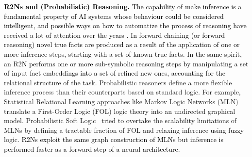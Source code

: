 \documentclass[journal]{IEEEtran}
\newcommand{\ar}[1]{\textcolor{black}{#1}}
\begin{document}
\ar{{\bf R2Ns and (Probabilistic) Reasoning. } The capability of make inference is a fundamental property of AI systems whose behaviour could be considered intelligent, and possible ways on how to automatize the process of reasoning have received a lot of attention over the years \cite{robinson2001handbook}. In forward chaining (or forward reasoning) \cite{russell2010artificial} novel true facts are produced as a result of the application of one or more inference steps, starting with a set of known true facts. In the same spirit, an R2N performs one or more sub-symbolic reasoning steps by manipulating a set of input fact embeddings into a set of refined new ones, accounting for the relational structure of the task.}
Probabilistic reasoners define a more flexible inference process than their counterparts based on standard logic. For example, Statistical Relational Learning approaches like Markov Logic Networks (MLN)~\cite{richardson2006markov} translate a  First-Order Logic (FOL) logic theory into an undirected graphical model.
Probabilistic Soft Logic~\cite{bach2017hinge} tried to overtake the scalability limitations of MLNs by defining a tractable fraction of FOL and relaxing inference using fuzzy logic. \ar{R2Ns exploit the same graph construction of MLNs but inference is performed faster as a forward step of a neural architecture.}
\end{document}
